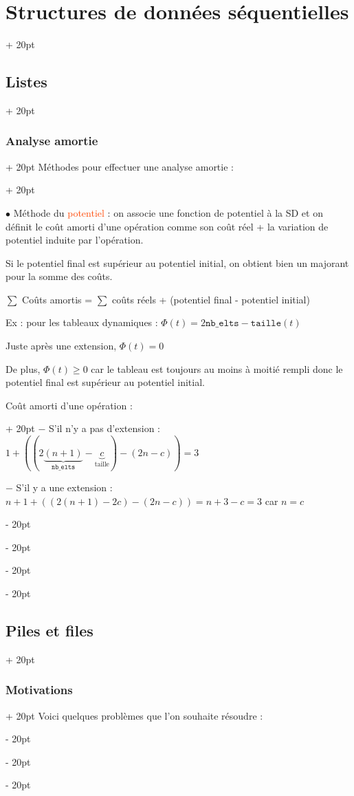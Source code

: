 \documentclass[a4paper, 12pt, twoside]{article}
\renewcommand{\emph}{\textcolor{ff4500}}
\renewcommand{\ge}{\geqslant}
\newcommand{\ind}[1][20pt]{\advance\leftskip + #1}
\newcommand{\deind}[1][20pt]{\advance\leftskip - #1}
\newenvironment{indt}[2][20pt]{#2 \par \ind[#1]}{\par \deind} %
\begin{document}
\begin{indt}{\section{Structures de données séquentielles}}
\begin{indt}{\subsection{Listes}}
\begin{indt}{\subsubsection{Analyse amortie}}
\begin{indt}{Méthodes pour effectuer une analyse amortie :}
                    \vspace{12pt}
                    
                    $\bullet$ Méthode du \emph{potentiel} : on associe une fonction de potentiel à la SD et on définit le coût amorti d'une opération comme son coût réel + la variation de potentiel induite par l'opération.
                    
                    Si le potentiel final est supérieur au potentiel initial, on obtient bien un majorant pour la somme des coûts.
                    
                    $\sum$ Coûts amortis = $\sum$ coûts réels + (potentiel final - potentiel initial)
                    
                    \vspace{6pt}
                    
                    Ex : pour les tableaux dynamiques : $\Phi(t) = 2\mathtt{nb\_elts} - \mathtt{taille}(t)$
                    
                    Juste après une extension, $\Phi(t) = 0$
                    
                    De plus, $\Phi(t) \ge 0$ car le tableau est toujours au moins à moitié rempli donc le potentiel final est supérieur au potentiel initial.
                    
                    \begin{indt}{Coût amorti d'une opération :}
                        $-$ S'il n'y a pas d'extension : $1 + ((2\underbrace{(n + 1)}_{\mathtt{nb\_elts}} - \underbrace{c}_{\text{taille}}) - (2n - c)) = 3$
                        
                        $-$ S'il y a une extension : $n + 1 + ((2(n + 1) - 2c) - (2n - c)) = n + 3 - c = 3$ car $n = c$
                    \end{indt}
                    
                \end{indt}
            \end{indt}
        \end{indt}
        
        \vspace{12pt}
        
        \begin{indt}{\subsection{Piles et files}}
            \begin{indt}{\subsubsection{Motivations}}
                Voici quelques problèmes que l'on souhaite résoudre :
                

\end{indt}
\end{indt}
\end{indt}
\end{document}
